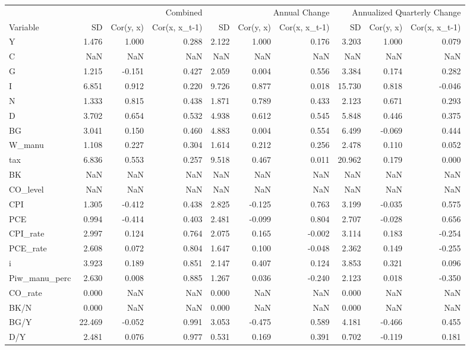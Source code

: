 \begin{tabular}{lrrrrrrrrr}
\toprule
 & \multicolumn{3}{r}{Combined} & \multicolumn{3}{r}{Annual Change} & \multicolumn{3}{r}{Annualized Quarterly Change} \\
Variable & SD & Cor(y, x) & Cor(x, x_{t-1}) & SD & Cor(y, x) & Cor(x, x_{t-1}) & SD & Cor(y, x) & Cor(x, x_{t-1}) \\
\midrule
Y & 1.476 & 1.000 & 0.288 & 2.122 & 1.000 & 0.176 & 3.203 & 1.000 & 0.079 \\
C & NaN & NaN & NaN & NaN & NaN & NaN & NaN & NaN & NaN \\
G & 1.215 & -0.151 & 0.427 & 2.059 & 0.004 & 0.556 & 3.384 & 0.174 & 0.282 \\
I & 6.851 & 0.912 & 0.220 & 9.726 & 0.877 & 0.018 & 15.730 & 0.818 & -0.046 \\
N & 1.333 & 0.815 & 0.438 & 1.871 & 0.789 & 0.433 & 2.123 & 0.671 & 0.293 \\
D & 3.702 & 0.654 & 0.532 & 4.938 & 0.612 & 0.545 & 5.848 & 0.446 & 0.375 \\
BG & 3.041 & 0.150 & 0.460 & 4.883 & 0.004 & 0.554 & 6.499 & -0.069 & 0.444 \\
W_manu & 1.108 & 0.227 & 0.304 & 1.614 & 0.212 & 0.256 & 2.478 & 0.110 & 0.052 \\
tax & 6.836 & 0.553 & 0.257 & 9.518 & 0.467 & 0.011 & 20.962 & 0.179 & 0.000 \\
BK & NaN & NaN & NaN & NaN & NaN & NaN & NaN & NaN & NaN \\
CO_level & NaN & NaN & NaN & NaN & NaN & NaN & NaN & NaN & NaN \\
CPI & 1.305 & -0.412 & 0.438 & 2.825 & -0.125 & 0.763 & 3.199 & -0.035 & 0.575 \\
PCE & 0.994 & -0.414 & 0.403 & 2.481 & -0.099 & 0.804 & 2.707 & -0.028 & 0.656 \\
CPI_rate & 2.997 & 0.124 & 0.764 & 2.075 & 0.165 & -0.002 & 3.114 & 0.183 & -0.254 \\
PCE_rate & 2.608 & 0.072 & 0.804 & 1.647 & 0.100 & -0.048 & 2.362 & 0.149 & -0.255 \\
i & 3.923 & 0.189 & 0.851 & 2.147 & 0.407 & 0.124 & 3.853 & 0.321 & 0.096 \\
Piw_manu_perc & 2.630 & 0.008 & 0.885 & 1.267 & 0.036 & -0.240 & 2.123 & 0.018 & -0.350 \\
CO_rate & 0.000 & NaN & NaN & 0.000 & NaN & NaN & 0.000 & NaN & NaN \\
BK/N & 0.000 & NaN & NaN & 0.000 & NaN & NaN & 0.000 & NaN & NaN \\
BG/Y & 22.469 & -0.052 & 0.991 & 3.053 & -0.475 & 0.589 & 4.181 & -0.466 & 0.455 \\
D/Y & 2.481 & 0.076 & 0.977 & 0.531 & 0.169 & 0.391 & 0.702 & -0.119 & 0.181 \\
\bottomrule
\end{tabular}

